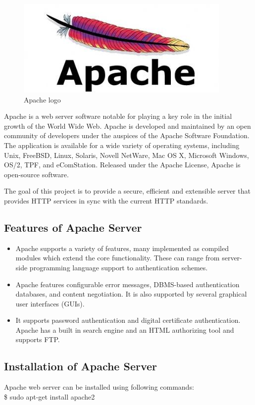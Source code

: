 \begin{figure}[h]
\centering\includegraphics[scale=0.5]{images/apache.jpg}
\caption{Apache logo}
\end{figure}
\noindent Apache is a web server software notable for playing a key role in the initial 
growth of the World Wide Web. Apache is developed and maintained by an 
open community of developers under the auspices of the Apache Software 
Foundation. The application is available for a wide variety of operating 
systems, including Unix, FreeBSD, Linux, Solaris, Novell NetWare, Mac OS X, 
Microsoft Windows, OS/2, TPF, and eComStation. Released under the Apache 
License, Apache is open-source software.

\noindent The goal of this project is to provide a secure, efficient and extensible 
server that provides HTTP services in sync with the current HTTP standards.
\subsection{Features of Apache Server}
\begin{itemize}
\item Apache supports a variety of features, many implemented as compiled 
modules which extend the core functionality. These can range from 
server-side programming language support to authentication schemes. 
\item Apache features configurable error messages, DBMS-based 
authentication databases, and content negotiation. It is also supported 
by several graphical user interfaces (GUIs).
\item It supports password authentication and digital certificate 
authentication. Apache has a built in search engine and an HTML authorizing 
tool and supports FTP.
\end{itemize}

\subsection{Installation of Apache Server}
Apache web server can be installed using following commands:\\

\hspace{4pt} \$ sudo apt-get install apache2


